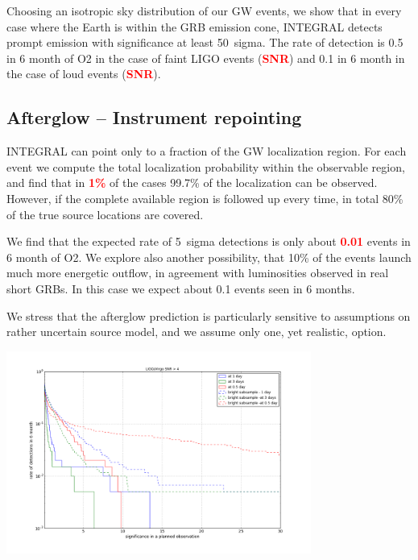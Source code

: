 \documentclass[a0,portrait]{a0poster}
\newcommand{\vs}[1] {\textbf{\textcolor{red}{#1}}}
\begin{document}
\begin{multicols}{2}
Choosing an isotropic sky distribution of our GW events, we show that
in every case where the Earth is within the GRB emission cone,
INTEGRAL detects prompt emission with significance at least 50~sigma.
The rate of detection is 0.5 in 6 month of O2 in the case of faint
LIGO events (\vs{SNR}) and 0.1 in 6 month in the case of loud events
(\vs{SNR}).

\subsection*{Afterglow -- Instrument repointing}

INTEGRAL can point only to a fraction of the GW localization region. For each
event we compute the total localization probability within the observable
region, and find that in \vs{1\%} of the cases 99.7\% of the localization can be
observed. However, if the complete available region is followed up every
time, in total 80\% of the true source locations are covered.

We find that the expected rate of 5~sigma detections is only about
\vs{0.01} events in 6 month of O2. We explore also another
possibility, that 10\% of the events launch much more energetic
outflow, in agreement with luminosities observed in real short
GRBs. In this case we expect about 0.1 events seen in 6 months. 

We stress that the afterglow prediction is particularly sensitive to
assumptions on rather uncertain source model, and we assume only
one, yet realistic, option.

\begin{center}\vspace{.5cm}
  \includegraphics[width=10cm]{figures/significance_vs_rate_af.png}
    \label{covered_region}
\end{center}


\end{multicols}
\end{document}
